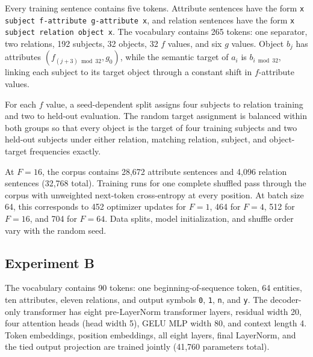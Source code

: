 \documentclass[11pt]{article}
\begin{document}
Every training sentence contains five tokens. Attribute sentences have the form
\texttt{x subject f-attribute g-attribute x}, and relation sentences have the
form \texttt{x subject relation object x}. The vocabulary contains 265 tokens:
one separator, two relations, 192 subjects, 32 objects, 32 $f$ values, and six
$g$ values. Object $b_j$ has attributes $(f_{(j+3)\bmod32},g_0)$, while the
semantic target of $a_i$ is $b_{i\bmod32}$, linking each subject to its target
object through a constant shift in $f$-attribute values.

For each $f$ value, a seed-dependent split assigns four subjects to relation
training and two to held-out evaluation. The random target assignment is
balanced within both groups so that every object is the target of four training
subjects and two held-out subjects under either relation, matching relation,
subject, and object-target frequencies exactly.

At $F=16$, the corpus contains 28,672 attribute sentences and 4,096 relation
sentences (32,768 total). Training runs for one complete shuffled pass through
the corpus with unweighted next-token cross-entropy at every position. At batch
size 64, this corresponds to 452 optimizer updates for $F=1$, 464 for $F=4$, 512
for $F=16$, and 704 for $F=64$. Data splits, model initialization, and shuffle
order vary with the random seed.

\subsection{Experiment B}

The vocabulary contains 90 tokens: one beginning-of-sequence token, 64 entities,
ten attributes, eleven relations, and output symbols \texttt{0}, \texttt{1},
\texttt{n}, and \texttt{y}. The decoder-only transformer has eight pre-LayerNorm
transformer layers, residual width 20, four attention heads (head width
5), GELU MLP width 80, and context length 4. Token embeddings, position
embeddings, all eight layers, final LayerNorm, and the tied output projection
are trained jointly (41,760 parameters total).
\end{document}
